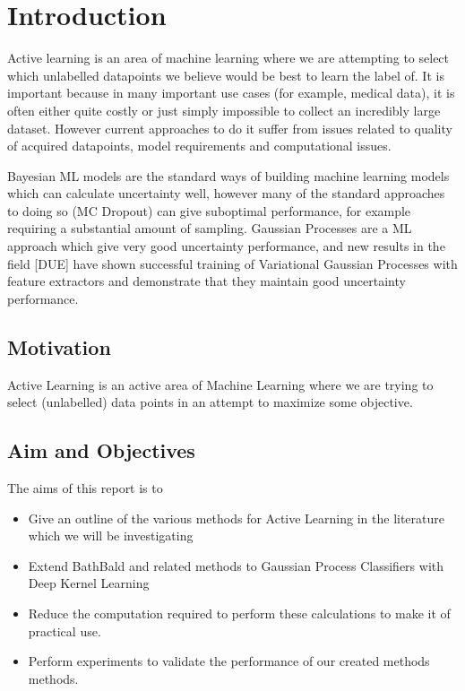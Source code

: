\documentclass[12pt, a4paper]{report}
\theoremstyle{definition}
\theoremstyle{definition}
\theoremstyle{definition}
\begin{document}
\chapter{Introduction}

Active learning is an area of machine learning where we are attempting to select which unlabelled datapoints we believe would be best to learn the label of. It is important because in many important use cases (for example, medical data), it is often either quite costly or just simply impossible to collect an incredibly large dataset. However current approaches to do it suffer from issues related to quality of acquired datapoints, model requirements and computational issues.

Bayesian ML models are the standard ways of building machine learning models which can calculate uncertainty well, however many of the standard approaches to doing so (MC Dropout) can give suboptimal performance, for example requiring a substantial amount of sampling. Gaussian Processes are a ML approach which give very good uncertainty performance, and new results in the field [DUE] have shown successful training of Variational Gaussian Processes with feature extractors and demonstrate that they maintain good uncertainty performance.

\section{Motivation}

Active Learning is an active area of Machine Learning where we are trying to select (unlabelled) data points in an attempt to maximize some objective.
\section{Aim and Objectives}

The aims of this report is to

\begin{itemize}
    \item Give an outline of the various methods for Active Learning in the literature which we will be investigating
    \item Extend BathBald and related methods to Gaussian Process Classifiers with Deep Kernel Learning
    \item Reduce the computation required to perform these calculations to make it of practical use.
    \item Perform experiments to validate the performance of our created methods methods.
\end{itemize}
\end{document}
